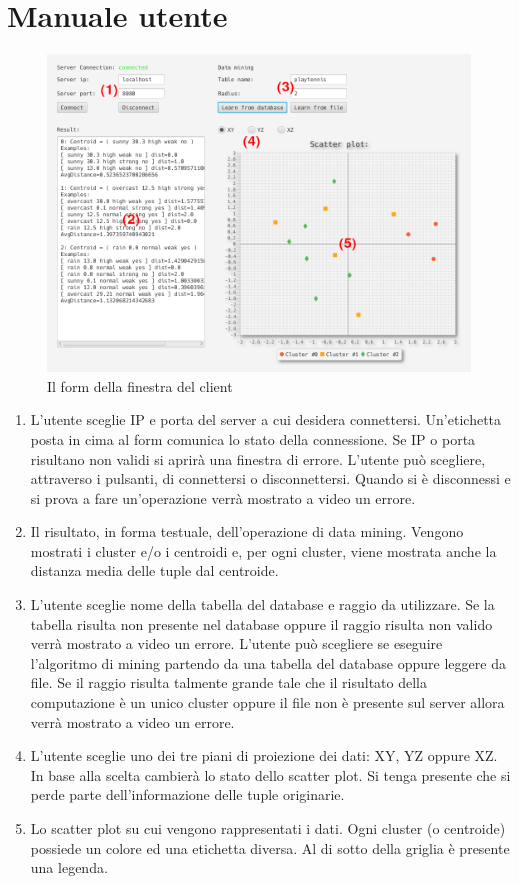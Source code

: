 \documentclass{article}
\begin{document}
	\section{Manuale utente}
	\begin{figure}[h]
		\includegraphics[width=\linewidth]{windowform.png}
		\caption{Il form della finestra del client}
	\end{figure}
	\begin{enumerate}
		\item L'utente sceglie IP e porta del server a cui desidera connettersi.
		Un'etichetta posta in cima al form comunica lo stato della connessione.
		Se IP o porta risultano non validi si aprirà una finestra di errore.
		L'utente può scegliere, attraverso i pulsanti, di connettersi o
		disconnettersi. Quando si è disconnessi e si prova a fare un'operazione
		verrà mostrato a video un errore.
		\item Il risultato, in forma testuale, dell'operazione di data mining.
		Vengono mostrati i cluster e/o i centroidi e, per ogni cluster, viene
		mostrata anche la distanza media delle tuple dal centroide.
		\item L'utente sceglie nome della tabella del database e raggio da
		utilizzare. Se la tabella risulta non presente nel database oppure il
		raggio risulta non valido verrà mostrato a video un errore. L'utente
		può scegliere se eseguire l'algoritmo di mining partendo da una tabella
		del database oppure leggere da file. Se il raggio risulta talmente
		grande tale che il risultato della computazione è un unico cluster
		oppure il file non è presente sul server allora verrà mostrato a
		video un errore.
		\item L'utente sceglie uno dei tre piani di proiezione dei dati:
		XY, YZ oppure XZ. In base alla scelta cambierà lo stato dello scatter
		plot. Si tenga presente che si perde parte dell'informazione delle
		tuple originarie.
		\item Lo scatter plot su cui vengono rappresentati i dati. Ogni cluster
		(o centroide) possiede un colore ed una etichetta diversa. Al di sotto
		della griglia è presente una legenda.
	\end{enumerate}
\end{document}
